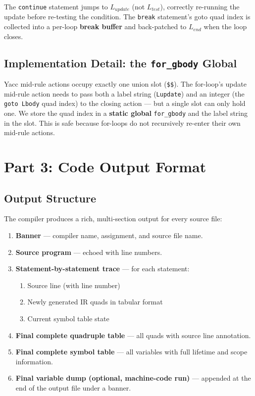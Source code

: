\documentclass[11pt]{article}
\begin{document}
\noindent The \texttt{continue} statement jumps to $L_{update}$ (not $L_{test}$), correctly re-running the update before re-testing the condition. The \texttt{break} statement's goto quad index is collected into a per-loop \textbf{break buffer} and back-patched to $L_{end}$ when the loop closes.

\subsection{Implementation Detail: the \texttt{for\_gbody} Global}

Yacc mid-rule actions occupy exactly one union slot (\texttt{\$\$}). The for-loop's update mid-rule action needs to pass both a label string (\texttt{Lupdate}) and an integer (the \texttt{goto Lbody} quad index) to the closing action --- but a single slot can only hold one. We store the quad index in a \textbf{static global} \texttt{for\_gbody} and the label string in the slot. This is safe because for-loops do not recursively re-enter their own mid-rule actions.

\section{Part 3: Code Output Format}

\subsection{Output Structure}

The compiler produces a rich, multi-section output for every source file:

\begin{enumerate}
    \item \textbf{Banner} --- compiler name, assignment, and source file name.
    \item \textbf{Source program} --- echoed with line numbers.
    \item \textbf{Statement-by-statement trace} --- for each statement:
    \begin{enumerate}[label=\alph*.]
        \item Source line (with line number)
        \item Newly generated IR quads in tabular format
        \item Current symbol table state
    \end{enumerate}
    \item \textbf{Final complete quadruple table} --- all quads with source line annotation.
    \item \textbf{Final complete symbol table} --- all variables with full lifetime and scope information.
    \item \textbf{Final variable dump (optional, machine-code run)} --- appended at the end of the output file under a banner.
\end{enumerate}
\end{document}
